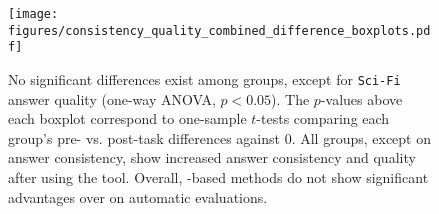 %
%
%
%
%
\begin{figure}[t]
    \centering
    \texttt{[image: figures/consistency\_quality\_combined\_difference\_boxplots.pdf]}
    \caption{
    No significant differences exist among groups, except for \texttt{Sci-Fi} answer quality (one-way ANOVA, \(p < 0.05\)).  
    The \(p\)-values above each boxplot correspond to one-sample \(t\)-tests comparing each group's pre- vs. post-task differences against 0. All groups, except \lloom{} on answer consistency, show increased answer consistency and quality after using the tool.
    Overall, \mm{}-based methods do not show significant advantages over  on automatic evaluations. %
    }
    \label{fig:automatic_evaluation}
\end{figure}
%

